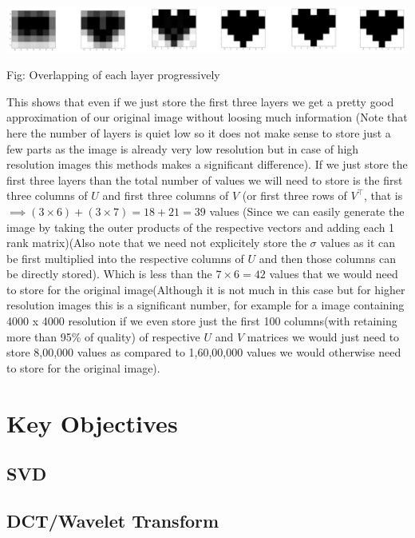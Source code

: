 \documentclass{article}
\begin{document}
\begin{center}
    \includegraphics[width=16.5cm]{masked_images.png}
\end{center}

\begin{center}
    Fig: Overlapping of each layer progressively
\end{center}

This shows that even if we just store the first three layers we get a pretty good approximation of our original image without loosing much information (Note that here the number of layers is quiet low so it does not make sense to store just a few parts as the image is already very low resolution but in case of high resolution images this methods makes a significant difference). If we just store the first three layers than the total number of values we will need to store is the first three columns of $U$ and first three columns of $V$ (or first three rows of $V^{\top}$, that is $\implies (3 \times 6) + (3 \times 7) = 18 + 21 = 39$ values (Since we can easily generate the image by taking the outer products of the respective vectors and adding each 1 rank matrix)(Also note that we need not explicitely store the $\sigma$ values as it can be first multiplied into the respective columns of $U$ and then those columns can be directly stored). Which is less than the $7 \times 6 = 42$ values that we would need to store for the original image(Although it is not much in this case but for higher resolution images this is a significant number, for example for a image containing 4000 x 4000 resolution if we even store just the first 100 columns(with retaining more than 95\% of quality) of respective $U$ and $V$ matrices we would just need to store 8,00,000 values as compared to 1,60,00,000 values we would otherwise need to store for the original image).

\section{Key Objectives}
\subsection{SVD}
\subsection{DCT/Wavelet Transform}
\end{document}
